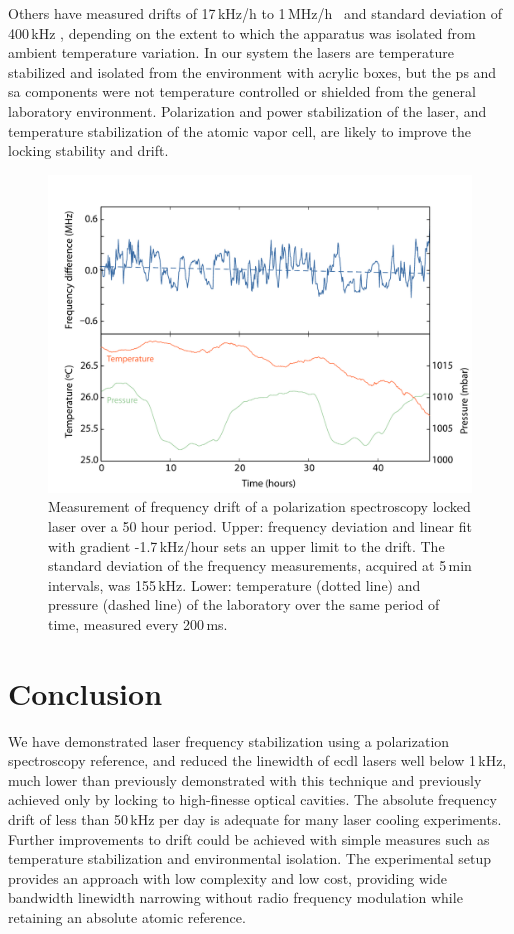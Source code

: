Others have measured drifts of 17\,kHz/h to 1\,MHz/h~\cite{yoshikawa_frequency_2003, tiwari_laser_2006} and standard deviation of 400\,kHz \cite{lee_frequency_2014}, depending on the extent to which the apparatus was isolated from ambient temperature variation. In our system the lasers are temperature stabilized and isolated from the environment with acrylic boxes, but the \gls*{ps} and \gls*{sa} components were not temperature controlled or shielded from the general laboratory environment.  Polarization and power stabilization of the laser, and temperature stabilization of the atomic vapor cell, are likely to improve the locking stability and drift.

\begin{figure}[htbp]
\centering
\includegraphics[width=\linewidth]{chapter1/Figs/fig6_v1.pdf}
\caption{Measurement of frequency drift of a polarization spectroscopy locked laser over a 50 hour period. Upper: frequency deviation and linear fit with gradient -1.7\,kHz/hour sets an upper limit to the drift. The standard deviation of the frequency measurements, acquired at 5\,min intervals, was 155\,kHz. Lower: temperature (dotted line) and pressure (dashed line) of the laboratory over the same period of time, measured every 200\,ms.}
\label{drift}
\end{figure}

\section{Conclusion}
We have demonstrated laser frequency stabilization using a polarization spectroscopy reference, and reduced the linewidth of \gls*{ecdl} lasers well below 1\,kHz, much lower than previously demonstrated with this technique and previously achieved only by locking to high-finesse optical cavities. The absolute frequency drift of less than 50\,kHz per day is adequate for many laser cooling experiments.  Further improvements to drift could be achieved with simple measures such as temperature stabilization and environmental isolation. The experimental setup provides an approach with low complexity and low cost, providing wide bandwidth linewidth narrowing without radio frequency modulation while retaining an absolute atomic reference.

